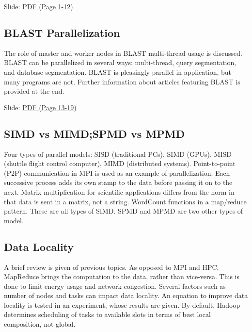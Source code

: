 
  Slide:
  \href{https://drive.google.com/open?id=0B88HKpainTSfdnFvY1V3dlFTRlE}{PDF
  (Page 1-12)}

\subsection{BLAST Parallelization}

The role of master and worker nodes in BLAST multi-thread usage is
discussed. BLAST can be parallelized in several ways: multi-thread,
query segmentation, and database segmentation. BLAST is pleasingly
parallel in application, but many programs are not. Further information
about articles featuring BLAST is provided at the end.


  Slide:
  \href{https://drive.google.com/open?id=0B88HKpainTSfdnFvY1V3dlFTRlE}{PDF
  (Page 13-19)}

\subsection{SIMD vs MIMD;SPMD vs MPMD}

Four types of parallel models: SISD (traditional PCs), SIMD (GPUs), MISD
(shuttle flight control computer), MIMD (distributed systems).
Point-to-point (P2P) communication in MPI is used as an example of
parallelization. Each successive process adds its own stamp to the data
before passing it on to the next. Matrix multiplication for scientific
applications differs from the norm in that data is sent in a matrix, not
a string. WordCount functions in a map/reduce pattern. These are all
types of SIMD. SPMD and MPMD are two other types of model.


\subsection{Data Locality}

A brief review is given of previous topics. As opposed to MPI and HPC,
MapReduce brings the computation to the data, rather than vice-versa.
This is done to limit energy usage and network congestion. Several
factors such as number of nodes and tasks can impact data locality. An
equation to improve data locality is tested in an experiment, whose
results are given. By default, Hadoop determines scheduling of tasks to
available slots in terms of best local composition, not global.

